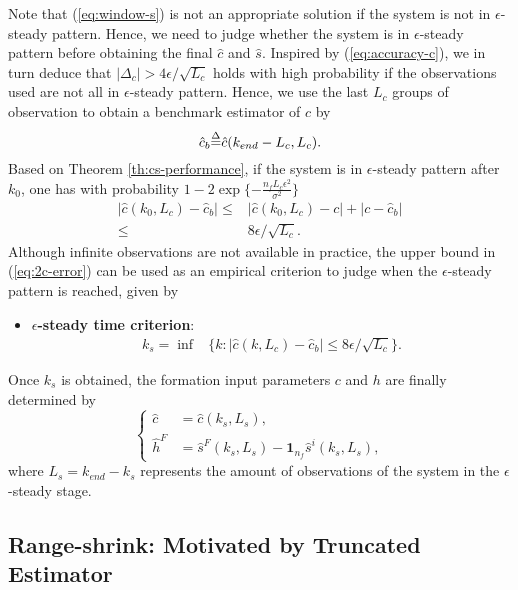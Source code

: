 \documentclass[12pt,journal,draftclsnofoot,onecolumn]{IEEEtran}
\let \sss=\scriptscriptstyle
\begin{document}
Note that (\ref{eq:window-s}) is not an appropriate solution if the system is not in $\epsilon$-steady pattern. 
Hence, we need to judge whether the system is in $\epsilon$-steady pattern before obtaining the final $\hat c$ and $\hat s$. 
Inspired by (\ref{eq:accuracy-c}), 
we in turn deduce that $| \Delta_c | > {4\epsilon}/{\sqrt{L_c}}$ holds with high probability if the observations used are not all in $\epsilon$-steady pattern. 
Hence, we use the last $L_c$ groups of observation to obtain a benchmark estimator of $c$ by 
\begin{equation}
\hat c_b {\buildrel \Delta \over =} \hat c(k_{end}-L_c,L_c).
\end{equation}
Based on Theorem \ref{th:cs-performance}, 
if the system is in $\epsilon$-steady pattern after $k_0$, one has with probability $1 - 2 \exp\{-\frac{ {n_f} {L_c}\epsilon^{2}}{\sigma^{2}}\}$
\begin{align} \label{eq:2c-error}
| \hat c(k_0,L_c)- \hat c_b| \le &| \hat c(k_0,L_c)- c| + |c-\hat c_b | \nonumber \\
\le & {8\epsilon}/{\sqrt{L_c}}.
\end{align}
Although infinite observations are not available in practice, the upper bound in (\ref{eq:2c-error}) can be used as an empirical criterion to judge when the $\epsilon$-steady pattern is reached, given by
\begin{itemize}
\item \textbf{$\epsilon$-steady time criterion}:
\begin{align}\label{eq:criterion-ks}
{ k_{s}} \!=\! \inf &\{ k : |\hat c(k,L_c)-\hat c_b | \le {8\epsilon}/{\sqrt{L_c}} \}.
\end{align}
\end{itemize}
Once ${k_{s}}$ is obtained, the formation input parameters $c$ and $h$ are finally determined by 
\begin{equation}\label{eq:final-ch}
\left \{
\begin{aligned}
\hat c &= \hat c(k_{s},L_{s}),  \\
\hat h^{\sss F} & =  \hat s^{\sss F}(k_{s},L_{s}) \!-\!\bm{1}_{n_f} \hat s^{i}(k_{s},L_{s}),  
\end{aligned} \right.
\end{equation}
where $L_{s}=k_{end}-k_{s}$ represents the amount of observations of the system in the $\epsilon$-steady stage. 





\subsection{Range-shrink: Motivated by Truncated Estimator}
\end{document}
